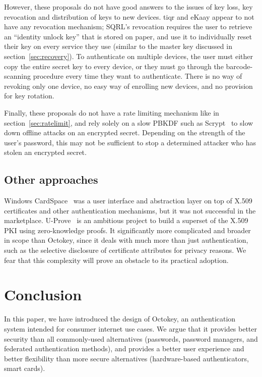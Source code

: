 However, these proposals do not have good answers to the issues of key loss, key revocation and
distribution of keys to new devices. tiqr and eKaay appear to not have any revocation mechanism;
SQRL's revocation requires the user to retrieve an ``identity unlock key'' that is stored on paper,
and use it to individually reset their key on every service they use (similar to the master key
discussed in section~\ref{sec:recovery}). To authenticate on multiple devices, the user must either
copy the entire secret key to every device, or they must go through the barcode-scanning procedure
every time they want to authenticate. There is no way of revoking only one device, no easy way of
enrolling new devices, and no provision for key rotation.

Finally, these proposals do not have a rate limiting mechanism like in section~\ref{sec:ratelimit},
and rely solely on a slow PBKDF such as Scrypt~\cite{Percival09} to slow down offline attacks on an
encrypted secret. Depending on the strength of the user's password, this may not be sufficient to
stop a determined attacker who has stolen an encrypted secret.

\subsection{Other approaches}

Windows CardSpace~\cite{Chappell06} was a user interface and abstraction layer on top of X.509
certificates and other authentication mechanisms, but it was not successful in the marketplace.
U-Prove~\cite{Paquin13} is an ambitious project to build a superset of the X.509 PKI using
zero-knowledge proofs. It significantly more complicated and broader in scope than Octokey, since it
deals with much more than just authentication, such as the selective disclosure of certificate
attributes for privacy reasons. We fear that this complexity will prove an obstacle to its practical
adoption.

\section{Conclusion}

In this paper, we have introduced the design of Octokey, an authentication system intended for
consumer internet use cases. We argue that it provides better security than all commonly-used
alternatives (passwords, password managers, and federated authentication methods), and provides a
better user experience and better flexibility than more secure alternatives (hardware-based
authenticators, smart cards).

